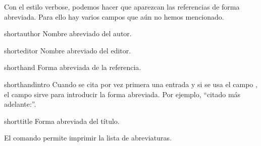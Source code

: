 Con el estilo  verbose, podemos hacer que aparezcan las referencias de
forma abreviada. Para ello hay varios campos que aún no hemos mencionado.

\begin{choix}
    \item[shortauthor] Nombre abreviado del autor.
    \item[shorteditor] Nombre abreviado del editor.
    \item[shorthand] Forma abreviada de la referencia.
    \item[shorthandintro] Cuando se cita por vez primera una entrada y
      si se usa el campo , el campo
       sirve para introducir la forma abreviada.
      Por ejemplo, \enquote{citado más adelante:}.
    \item[shorttitle] Forma abreviada del título.
\end{choix}

El comando  permite imprimir la lista de abreviaturas.

\bibverbosetrad
